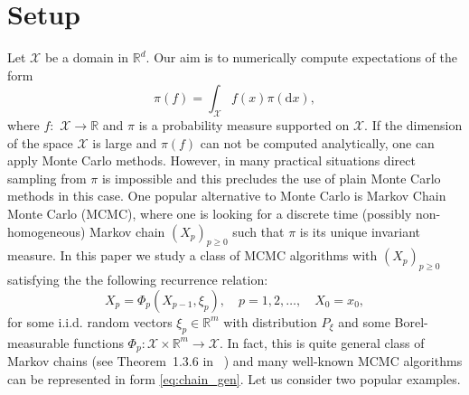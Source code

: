 \documentclass[bj]{imsart}
\def\rmd{\mathrm{d}}
\begin{document}
\section{Setup}\label{sec:setup}
Let  \(\mathcal{X}\) be a domain in \( \mathbb{R}^d.\)  Our aim is to numerically compute  expectations of the form
\[
\pi(f)=\int_{\mathcal{X}} f(x)\pi(\rmd x),
\]
where \(f:\) \(\mathcal{X}\longrightarrow \mathbb{R}\) and \(\pi\) is a probability measure supported on \(\mathcal{X}.\)
If  the dimension of the space \(\mathcal{X}\) is large and \(\pi(f)\) can not be computed analytically, one can apply Monte Carlo methods. However, in many practical situations  direct sampling from \(\pi\) is impossible and this precludes the use of plain Monte Carlo methods in this case. One popular alternative to Monte Carlo  is Markov Chain Monte Carlo (MCMC), where one is looking for a discrete time  (possibly non-homogeneous) Markov chain   \((X_p)_{p\geq 0}\) such that \(\pi\) is its unique invariant measure. In this paper we study a class of MCMC algorithms with \((X_p)_{p\geq 0}\) satisfying the  the following recurrence relation:
\begin{equation}
\label{eq:chain_gen}
X_{p}=\Phi_{p}(X_{p-1},\xi_{p}),\quad p=1,2,\ldots ,\quad X_{0}=x_0,
\end{equation}
for some i.i.d.  random vectors \(\xi_p\in \mathbb{R}^m\) with distribution \(P_{\xi}\)
and some Borel-measurable
functions $\Phi_{p}\colon\mathcal{X}\times\mathbb{R}^{m}\to\mathcal{X}.$
In fact, this is quite general class of Markov chains (see Theorem~1.3.6 in ~\cite{moulines2018})
and many well-known MCMC algorithms can be represented in form \eqref{eq:chain_gen}.
Let us consider two popular examples.
\end{document}

